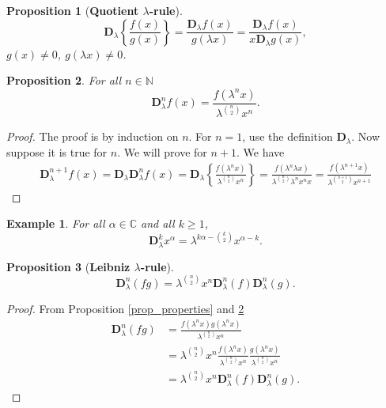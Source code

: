 \documentclass[12pt]{article}
\newcommand{\C}{\mathbb{C}}
\newcommand{\N}{\mathbb{N}}
\newcommand{\D}{\mathbf{D}}
\newtheorem{proposition}{Proposition}
\newtheorem{example}{Example}
\begin{document}
\begin{proposition}[{\bf Quotient $\lambda$-rule}]
\begin{equation}
 \mathbf{D}_{\lambda}\left\{\frac{f(x)}{g(x)}\right\}=\frac{\mathbf{D}_{\lambda}f(x)}{g(\lambda x)}=\frac{\mathbf{D}_{\lambda}f(x)}{x\mathbf{D}_{\lambda}g(x)}, 
\end{equation}
$g(x)\neq0$, $g(\lambda x)\neq0$.
\end{proposition}

\begin{proposition}\label{prop_dnf}
For all $n\in\N$
    \begin{equation}
        \mathbf{D}_{\lambda}^{n}f(x)=\frac{f(\lambda^nx)}{\lambda^{\binom{n}{2}}x^n}.
    \end{equation}
\end{proposition}
\begin{proof}
The proof is by induction on $n$. For $n=1$, use the definition $\mathbf{D}_{\lambda}$. Now suppose it is true for $n$. We will prove for $n+1$. We have
\begin{align*}
    \mathbf{D}_{\lambda}^{n+1}f(x)=\mathbf{D}_{\lambda}\mathbf{D}_{\lambda}^{n}f(x)=\mathbf{D}_{\lambda}\left\{\frac{f(\lambda^nx)}{\lambda^{\binom{n}{2}}x^{n}}\right\}=\frac{f(\lambda^{n}\lambda x)}{\lambda^{\binom{n}{2}}\lambda^nx^nx}=\frac{f(\lambda^{n+1}x)}{\lambda^{\binom{n+1}{2}}x^{n+1}}
\end{align*}
\end{proof}

\begin{example}
For all $\alpha\in\C$ and all $k\geq1$,
\begin{equation}
    \D_{\lambda}^kx^\alpha=\lambda^{k\alpha-\binom{k}{2}}x^{\alpha-k}.
\end{equation}
\end{example}

\begin{proposition}[{\bf Leibniz $\lambda$-rule}]
\begin{equation}
    \mathbf{D}_{\lambda}^{n}(fg)=\lambda^{\binom{n}{2}}x^{n}\mathbf{D}_{\lambda}^{n}(f)\mathbf{D}_{\lambda}^{n}(g).
\end{equation}    
\end{proposition}
\begin{proof}
From Proposition \ref{prop_properties} and \ref{prop_dnf}
\begin{align*}
    \mathbf{D}_{\lambda}^{n}(fg)&=\frac{f(\lambda^{n}x)g(\lambda^{n}x)}{\lambda^{\binom{n}{2}}x^n}\\
    &=\lambda^{\binom{n}{2}}x^n\frac{f(\lambda^nx)}{\lambda^{\binom{n}{2}}x^n}\frac{g(\lambda^nx)}{\lambda^{\binom{n}{2}}x^n}\\
    &=\lambda^{\binom{n}{2}}x^{n}\mathbf{D}_{\lambda}^n(f)\mathbf{D}_{\lambda}^{n}(g).
\end{align*}    
\end{proof}
\end{document}
